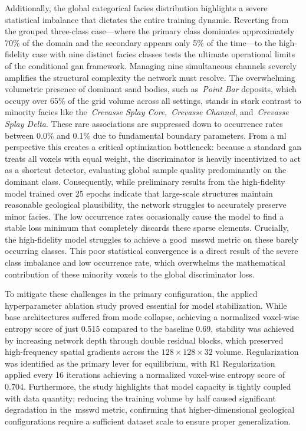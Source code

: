 Additionally, the global categorical facies distribution highlights a severe statistical imbalance that dictates the entire training dynamic. Reverting from the grouped three-class case—where the primary class dominates approximately 70\% of the domain and the secondary appears only 5\% of the time—to the high-fidelity case with nine distinct facies classes tests the ultimate operational limits of the conditional \gls{gan} framework. Managing nine simultaneous channels severely amplifies the structural complexity the network must resolve. The overwhelming volumetric presence of dominant sand bodies, such as~\textit{Point Bar} deposits, which occupy over 65\% of the grid volume across all settings, stands in stark contrast to minority facies like the~\textit{Crevasse Splay Core},~\textit{Crevasse Channel}, and~\textit{Crevasse Splay Delta}. These rare associations are suppressed down to occurrence rates between 0.0\% and 0.1\% due to fundamental boundary parameters. From a \gls{ml} perspective this creates a critical optimization bottleneck: because a standard \gls{gan} treats all voxels with equal weight, the discriminator is heavily incentivized to act as a shortcut detector, evaluating global sample quality predominantly on the dominant class. Consequently, while preliminary results from the high-fidelity model trained over 25 epochs indicate that large-scale structures maintain reasonable geological plausibility, the network struggles to accurately preserve minor facies. The low occurrence rates occasionally cause the model to find a stable loss minimum that completely discards these sparse elements. Crucially, the high-fidelity model struggles to achieve a good~\gls{msswd} metric on these barely occurring classes. This poor statistical convergence is a direct result of the severe class imbalance and low occurrence rate, which overwhelms the mathematical contribution of these minority voxels to the global discriminator loss.

To mitigate these challenges in the primary configuration, the applied hyperparameter ablation study proved essential for model stabilization. While base architectures suffered from mode collapse, achieving a normalized voxel-wise entropy score of just 0.515 compared to the baseline 0.69, stability was achieved by increasing network depth through double residual blocks, which preserved high-frequency spatial gradients across the $128 \times 128 \times 32$ volume. Regularization was identified as the primary lever for equilibrium, with R1 Regularization applied every 16 iterations achieving a normalized voxel-wise entropy score of 0.704. Furthermore, the study highlights that model capacity is tightly coupled with data quantity; reducing the training volume by half caused significant degradation in the~\gls{msswd} metric, confirming that higher-dimensional geological configurations require a sufficient dataset scale to ensure proper generalization. 

